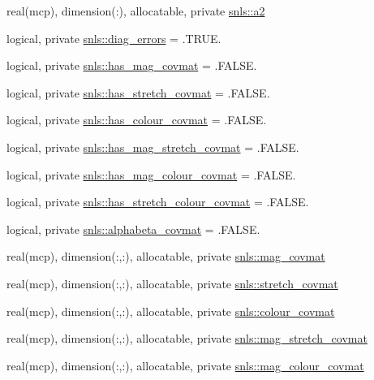 \begin{DoxyCompactItemize}
real(mcp), dimension(\+:), allocatable, private \mbox{\hyperlink{namespacesnls_a6472548375e64b614a5e7cae1b635b59}{snls\+::a2}}
\item 
logical, private \mbox{\hyperlink{namespacesnls_ae0c3dc7f2e96ed1de4ff8dfcc81195e9}{snls\+::diag\+\_\+errors}} = .T\+R\+U\+E.
\item 
logical, private \mbox{\hyperlink{namespacesnls_aa8d535884df485fb5762eb12ad31da9a}{snls\+::has\+\_\+mag\+\_\+covmat}} = .F\+A\+L\+S\+E.
\item 
logical, private \mbox{\hyperlink{namespacesnls_ae63c79b57efec7300a23d6437079ddae}{snls\+::has\+\_\+stretch\+\_\+covmat}} = .F\+A\+L\+S\+E.
\item 
logical, private \mbox{\hyperlink{namespacesnls_aa953f2792677b7c901fc89bebdd40c36}{snls\+::has\+\_\+colour\+\_\+covmat}} = .F\+A\+L\+S\+E.
\item 
logical, private \mbox{\hyperlink{namespacesnls_ae787ac7d0741e06d7699e05e691c1fac}{snls\+::has\+\_\+mag\+\_\+stretch\+\_\+covmat}} = .F\+A\+L\+S\+E.
\item 
logical, private \mbox{\hyperlink{namespacesnls_a3557a6ed568984b4640e4128088cbf19}{snls\+::has\+\_\+mag\+\_\+colour\+\_\+covmat}} = .F\+A\+L\+S\+E.
\item 
logical, private \mbox{\hyperlink{namespacesnls_a72767d5a50117b705a1dcb971e24462d}{snls\+::has\+\_\+stretch\+\_\+colour\+\_\+covmat}} = .F\+A\+L\+S\+E.
\item 
logical, private \mbox{\hyperlink{namespacesnls_ab8a52f43b875f3858fb98da0194a2cb8}{snls\+::alphabeta\+\_\+covmat}} = .F\+A\+L\+S\+E.
\item 
real(mcp), dimension(\+:,\+:), allocatable, private \mbox{\hyperlink{namespacesnls_a0dc9a08e398ee49bd864a8d88d95f195}{snls\+::mag\+\_\+covmat}}
\item 
real(mcp), dimension(\+:,\+:), allocatable, private \mbox{\hyperlink{namespacesnls_a56f3f501856e1777e0bb4960509f5d85}{snls\+::stretch\+\_\+covmat}}
\item 
real(mcp), dimension(\+:,\+:), allocatable, private \mbox{\hyperlink{namespacesnls_afed063275d19022044504128d8238e76}{snls\+::colour\+\_\+covmat}}
\item 
real(mcp), dimension(\+:,\+:), allocatable, private \mbox{\hyperlink{namespacesnls_a5ed1dbc069e004d9de1dd21d5c7786bc}{snls\+::mag\+\_\+stretch\+\_\+covmat}}
\item 
real(mcp), dimension(\+:,\+:), allocatable, private \mbox{\hyperlink{namespacesnls_a0579d76af88ce5be98b90af1b8d09b20}{snls\+::mag\+\_\+colour\+\_\+covmat}}

\end{DoxyCompactItemize}
